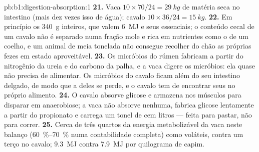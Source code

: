 \begin{solution}{pb:b1:digestion-absorption:1}
\textbf{21.} Vaca $10\times 70/24 = \qty{29}{kg}$ de matéria seca no
intestino (mais dez vezes isso de água); cavalo $10\times 36/24 =
\qty{15}{kg}$.
\textbf{22.} Em princípio os \qty{340}{g} inteiros, que valem
\qty{6}{MJ} e seus  essenciais; o conteúdo cecal de um
cavalo não é separado numa fração mole e rica em nutrientes como o de
um coelho, e um animal de meia tonelada não consegue recolher do chão
as próprias fezes em estado aproveitável.
\textbf{23.} Os micróbios do rúmen fabricam  a partir do
nitrogênio da ureia e do carbono da palha, e a vaca digere os
micróbios: ela quase não precisa de  alimentar. Os micróbios
do cavalo ficam além do seu intestino delgado, de modo que a 
deles se perde, e o cavalo tem de encontrar seus  no
próprio alimento.
\textbf{24.} O cavalo absorve glicose e armazena  nos
músculos para disparar em anaerobiose; a vaca não absorve nenhuma,
fabrica glicose lentamente a partir do propionato e carrega um tonel
de cem litros --- feita para pastar, não para correr.
\textbf{25.} Cerca de três quartos da energia metabolizável da vaca
neste balanço (\qtyrange{60}{70}{\%} numa contabilidade completa) como
 voláteis, contra um terço no cavalo; \qty{9.3}{MJ}
contra \qty{7.9}{MJ} por quilograma de capim.
\end{solution}
